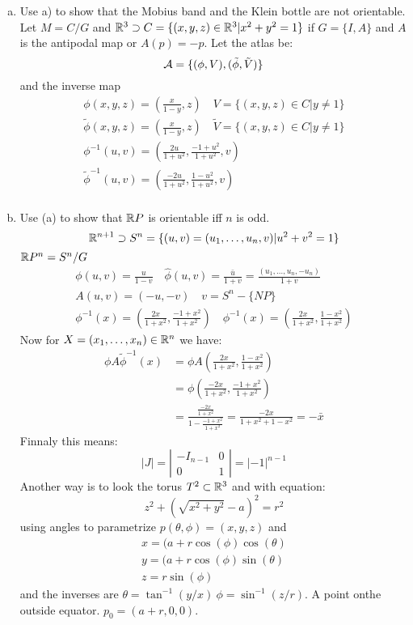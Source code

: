 \begin{enumerate}[a)]
\item Use a) to show that the Mobius band and the Klein bottle are not orientable. Let $M=C/G$ and $\mathbb{R}^3 \supset C= \{(x,y,z) \in \mathbb{R}^3 | x^2 + y^2 = 1 \}$ if $G=\{I,A\}$ and $A$ is the antipodal map or $A(p)=-p$. Let the atlas be:
$$\mathcal{A} = \{(\phi,V),(\tilde \phi, \tilde V)\}$$
and the inverse map 
\begin{gather*}
\phi(x,y,z) = (\frac{x}{1-y},z)\quad V=\{(x,y,z)\in C | y\neq 1\}\\ 
\tilde \phi(x,y,z) = (\frac{x}{1-y},z)\quad \tilde V=\{(x,y,z)\in C | y\neq 1\}\\
\phi^{-1} (u,v) = \left( \frac{2u}{1+u^2} , \frac{-1+u^2}{1+u^2} ,v \right) \\
\tilde \phi^{-1} (u,v) = \left( \frac{-2u}{1+u^2} , \frac{1-u^2}{1+u^2} ,v \right) \\
\end{gather*}
\item Use (a) to show that $\mathbb{R} P$ is orientable iff $n$ is odd. $$\mathbb{R}^{n+1} \supset S^n = \{(u,v)=(u_1,\ldots,u_n,v) | u^2 + v^2 =1 \} $$
$\mathbb{R} P^n= S^n/G$ 
\begin{gather*}
\phi(u,v) = \frac{u}{1-v} \quad \hat \phi(u,v) = \frac{\bar u}{1+v} = \frac{(u_1,\ldots, u_n,-u_n)}{1+v} \\
A(u,v) = (-u,-v) \quad v=S^n-\{NP \}\\
\phi^{-1}(x) = \left( \frac{2x}{1+x^2}, \frac{-1+x^2}{1+x^2} \right)\quad \phi^{-1}(x) = \left( \frac{2x}{1+x^2}, \frac{1-x^2}{1+x^2} \right)
\end{gather*}
Now for $X=(x_1,\ldots, x_n) \in \mathbb{R}^n$ we have:
\begin{align*}
\phi A \tilde \phi^{-1} (x) &= \phi A \left( \frac{2x}{1+x^2}, \frac{1-x^2}{1+x^2} \right)\\
&= \phi \left( \frac{ -2x}{1+x^2}, \frac{-1+x^2}{1+x^2} \right)\\
&= \frac{\frac{-2x}{1+x^2}}{1- \frac{-1+x^2}{1+x^2}} = \frac{-2x}{1+x^2 + 1-x^2} = -\bar x
\end{align*}
Finnaly this means:
$$|J| = \left| \begin{matrix} -I_{n-1} & 0 \\ 0 & 1 \end{matrix} \right| = |-1|^{n-1} $$
Another way is to look the torus $T^2 \subset \mathbb{R}^3$ and with equation:
$$z^2 + (\sqrt{x^2 + y^2} - a)^2 = r^2$$
using angles to parametrize $p(\theta,\phi)= (x,y,z)$ and 
\begin{gather*}
x=(a+r\cos(\phi) \cos(\theta) \\
y=(a+r\cos(\phi) \sin(\theta) \\
z=r\sin(\phi)
\end{gather*}
and the inverses are $\theta = \tan^{-1}(y/x) \ \phi=\sin^{-1}(z/r)$. A point onthe outside equator. $p_0 = (a+r,0,0)$.
\end{enumerate}
